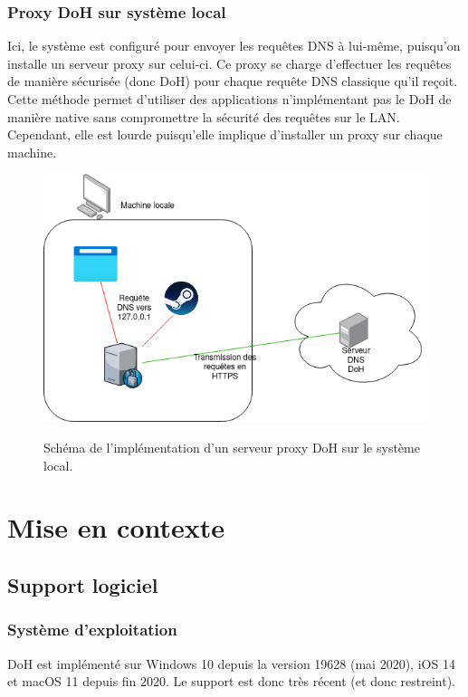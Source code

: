 \documentclass[a4paper,12pt]{article}
\begin{document}
	\subsubsection{Proxy DoH sur système local}
	
	Ici, le système est configuré pour envoyer les requêtes DNS à lui-même, puisqu'on installe un serveur proxy sur celui-ci. Ce proxy se charge d'effectuer les requêtes de manière sécurisée (donc DoH) pour chaque requête DNS classique qu'il reçoit.
	Cette méthode permet d'utiliser des applications n'implémentant pas le DoH de manière native sans compromettre la sécurité des requêtes sur le LAN. Cependant, elle est lourde puisqu'elle implique d'installer un proxy sur chaque machine.
	
	\begin{figure}[H]
		\begin{center}
			{\includegraphics[scale=0.6]{Images/schema_doh_proxy_local.png}}
		\end{center}
		\caption{Schéma de l'implémentation d'un serveur proxy DoH sur le système local.}
	\end{figure}

	\section{Mise en contexte}
	
	\subsection{Support logiciel}
	
	\subsubsection{Système d'exploitation}
	DoH est implémenté sur Windows 10 depuis la version 19628 (mai 2020), iOS 14 et macOS 11 depuis fin 2020. Le support est donc très récent (et donc restreint).
\end{document}
